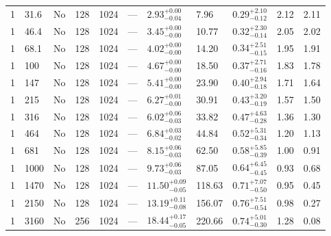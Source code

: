 \documentclass[aps, prfluids, onecolumn, notitlepage, nofootinbib, groupedaddress, amsfonts, amssymb, amsmath]{revtex4-1}
\begin{document}
\begin{center}
\begin{longtable}{ p{1cm} p{1cm} p{1cm} p{1cm} p{1cm} p{1cm} p{1.75cm} p{1.5cm} p{2.75cm} p{1cm} p{1.2cm}  }
\vspace{0.08cm}1	&	31.6	&	No	&	128	&	1024	&	---	&$	2.93	_{-	0.04	}^{+	0.00	}$&	7.96	&$	0.29	_{-	0.12	}^{+	2.10	}$&	2.12	&	2.11	\\
\vspace{0.08cm}1	&	46.4	&	No	&	128	&	1024	&	---	&$	3.45	_{-	0.00	}^{+	0.00	}$&	10.77	&$	0.32	_{-	0.14	}^{+	2.30	}$&	2.05	&	2.02	\\
\vspace{0.08cm}1	&	68.1	&	No	&	128	&	1024	&	---	&$	4.02	_{-	0.00	}^{+	0.00	}$&	14.20	&$	0.34	_{-	0.15	}^{+	2.51	}$&	1.95	&	1.91	\\
\vspace{0.08cm}1	&	100	&	No	&	128	&	1024	&	---	&$	4.67	_{-	0.00	}^{+	0.00	}$&	18.50	&$	0.37	_{-	0.16	}^{+	2.71	}$&	1.83	&	1.78	\\
\vspace{0.08cm}1	&	147	&	No	&	128	&	1024	&	---	&$	5.41	_{-	0.00	}^{+	0.00	}$&	23.90	&$	0.40	_{-	0.18	}^{+	2.94	}$&	1.71	&	1.64	\\
\vspace{0.08cm}1	&	215	&	No	&	128	&	1024	&	---	&$	6.27	_{-	0.00	}^{+	0.01	}$&	30.91	&$	0.43	_{-	0.19	}^{+	3.20	}$&	1.57	&	1.50	\\
\vspace{0.08cm}1	&	316	&	No	&	128	&	1024	&	---	&$	6.02	_{-	0.03	}^{+	0.06	}$&	33.82	&$	0.47	_{-	0.28	}^{+	4.63	}$&	1.36	&	1.30	\\
\vspace{0.08cm}1	&	464	&	No	&	128	&	1024	&	---	&$	6.84	_{-	0.02	}^{+	0.03	}$&	44.84	&$	0.52	_{-	0.34	}^{+	5.31	}$&	1.20	&	1.13	\\
\vspace{0.08cm}1	&	681	&	No	&	128	&	1024	&	---	&$	8.15	_{-	0.03	}^{+	0.06	}$&	62.50	&$	0.58	_{-	0.39	}^{+	5.85	}$&	1.00	&	0.91	\\
\vspace{0.08cm}1	&	1000	&	No	&	128	&	1024	&	---	&$	9.73	_{-	0.03	}^{+	0.06	}$&	87.05	&$	0.64	_{-	0.45	}^{+	6.45	}$&	0.93	&	0.68	\\
\vspace{0.08cm}1	&	1470	&	No	&	128	&	1024	&	---	&$	11.50	_{-	0.05	}^{+	0.09	}$&	118.63	&$	0.71	_{-	0.50	}^{+	7.07	}$&	0.95	&	0.45	\\
\vspace{0.08cm}1	&	2150	&	No	&	128	&	1024	&	---	&$	13.19	_{-	0.08	}^{+	0.11	}$&	156.07	&$	0.76	_{-	0.54	}^{+	7.51	}$&	0.98	&	0.27	\\
\vspace{0.08cm}1	&	3160	&	No	&	256	&	1024	&	---	&$	18.44	_{-	0.05	}^{+	0.17	}$&	220.66	&$	0.74	_{-	0.30	}^{+	5.01	}$&	1.28	&	0.08	\\

\end{longtable}
\end{center}
\end{document}
